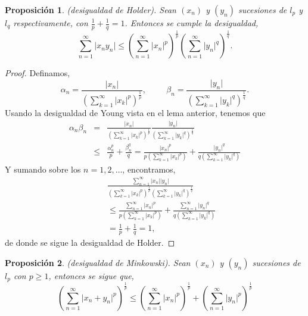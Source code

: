 \documentclass[12pt]{book}
\newtheorem{prop}{\bf Proposición}[chapter]
\begin{document}
   \begin{prop}(desigualdad de Holder). Sean $(x_n)$ y $(y_n)$ sucesiones de $l_p$ y $l_q$ 
respectivamente, con $\frac{1}{p}+\frac{1}{q}=1$. Entonces se cumple la desigualdad,
$$ \sum_{n=1}^\infty \vert x_n y_n\vert \leq \left(\sum_{n=1}^\infty \vert x_n\vert^p\right)^{\frac{1}{p}}
\left(\sum_{n=1}^\infty\vert y_n\vert^q\right)^{\frac{1}{q}}.$$
  \end{prop}
 \begin{proof}
Definamos,
$$\alpha_n= \frac{\vert x_n\vert}{\left(\sum_{k=1}^\infty\vert x_k\vert^p\right)^\frac{1}{p}},
\hspace{1cm} \beta_n=\frac{\vert y_n\vert}{\left(\sum_{k=1}^\infty \vert y_k\vert^q\right)^\frac{1}{q}}.$$
Usando la desigualdad de Young vista en el lema anterior, tenemos que
\begin{eqnarray*}
\alpha_n\beta_n &=&\frac{\vert x_n\vert}{\left(\sum_{k=1}^\infty\vert x_k\vert^p\right)^\frac{1}{p}}
\frac{\vert y_n\vert}{\left(\sum_{k=1}^\infty \vert y_k\vert^q\right)^\frac{1}{q}}\\
&\leq& \frac{\alpha_n^p}{p}+\frac{\beta_n^q}{q}=\frac{\vert x_n\vert^p}{p\left(\sum_{k=1}^\infty\vert 
x_k\vert^p\right)}+\frac{\vert y_n\vert^q}{q\left(\sum_{k=1}^\infty\vert y_k\vert^q\right)}
\end{eqnarray*}
Y sumando sobre los $n=1,2,\dots$, encontramos,
\begin{eqnarray*}
&&\frac{\sum_{n=1}^\infty\vert x_n\vert\vert y_n\vert}{\left(\sum_{k=1}^\infty \vert 
x_k\vert^p\right)^\frac{1}{p}
\left(\sum_{k=1}^\infty \vert y_k\vert^q\right)^\frac{1}{q}}\\
&&\leq \frac{\sum_{n=1}^\infty \vert x_n\vert^p}{p\left(\sum_{k=1}^\infty\vert x_k\vert^p\right)}
+\frac{\sum_{n=1}^\infty \vert y_n\vert^q}{q\left(\sum_{k=1}^\infty\vert y_k\vert^q\right)}\\
&&=\frac{1}{p}+\frac{1}{q}=1,
\end{eqnarray*}
de donde se sigue la desigualdad de Holder.
\end{proof}
\begin{prop}(desigualdad de Minkowski). Sean $(x_n)$ y $(y_n)$ sucesiones de $l_p$ con $p\geq 
1$, entonces se sigue que, 
$$\left(\sum_{n=1}^\infty \vert x_n + y_n\vert^p\right)^\frac{1}{p}\leq
 \left(\sum_{n=1}^\infty \vert x_n\vert^p\right)^\frac{1}{p} + \left(\sum_{n=1}^\infty \vert 
y_n\vert^p\right)^\frac{1}{p}$$
\end{prop}
\end{document}
